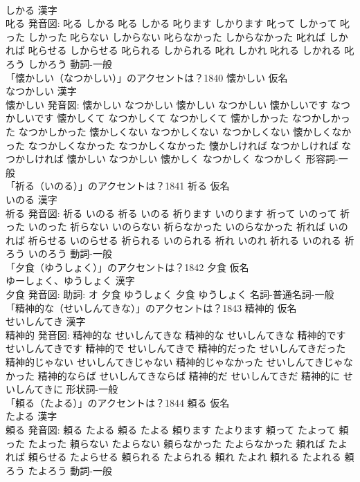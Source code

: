 \documentclass[8pt]{extreport}
\begin{document}
\begin{CJK}{UTF8}{min}
\\	しかる 漢字　
\\	叱る 発音図:	叱る しかる		叱る しかる 叱ります しかります 叱って しかって 叱った しかった 叱らない しからない 叱らなかった しからなかった 叱れば しかれば 叱らせる しからせる 叱られる しかられる 叱れ しかれ 叱れる しかれる 叱ろう しかろう				動詞-一般 
\\	「懐かしい（なつかしい）」のアクセントは？1840	懐かしい 仮名　
\\	なつかしい 漢字　
\\	懐かしい 発音図:	懐かしい なつかしい		懐かしい なつかしい 懐かしいです なつかしいです 懐かしくて なつかしくて なつかしくて 懐かしかった なつかしかった なつかしかった 懐かしくない なつかしくない なつかしくない 懐かしくなかった なつかしくなかった なつかしくなかった 懐かしければ なつかしければ なつかしければ 懐かしい なつかしい 懐かしく なつかしく なつかしく				形容詞-一般 
\\	「祈る（いのる）」のアクセントは？1841	祈る 仮名　
\\	いのる 漢字　
\\	祈る 発音図:	祈る いのる		祈る いのる 祈ります いのります 祈って いのって 祈った いのった 祈らない いのらない 祈らなかった いのらなかった 祈れば いのれば 祈らせる いのらせる 祈られる いのられる 祈れ いのれ 祈れる いのれる 祈ろう いのろう				動詞-一般 
\\	「夕食（ゆうしょく）」のアクセントは？1842	夕食 仮名　
\\	ゆーしょく、ゆうしょく 漢字　
\\	夕食 発音図: 助詞: オ	夕食 ゆうしょく		夕食 ゆうしょく				名詞-普通名詞-一般 
\\	「精神的な（せいしんてきな）」のアクセントは？1843	精神的 仮名　
\\	せいしんてき 漢字　
\\	精神的 発音図:	精神的な せいしんてきな		精神的な せいしんてきな 精神的です せいしんてきです 精神的で せいしんてきで 精神的だった せいしんてきだった 精神的じゃない せいしんてきじゃない 精神的じゃなかった せいしんてきじゃなかった 精神的ならば せいしんてきならば 精神的だ せいしんてきだ 精神的に せいしんてきに				形状詞-一般 
\\	「頼る（たよる）」のアクセントは？1844	頼る 仮名　
\\	たよる 漢字　
\\	頼る 発音図:	頼る たよる		頼る たよる 頼ります たよります 頼って たよって 頼った たよった 頼らない たよらない 頼らなかった たよらなかった 頼れば たよれば 頼らせる たよらせる 頼られる たよられる 頼れ たよれ 頼れる たよれる 頼ろう たよろう				動詞-一般 

\end{CJK}
\end{document}
